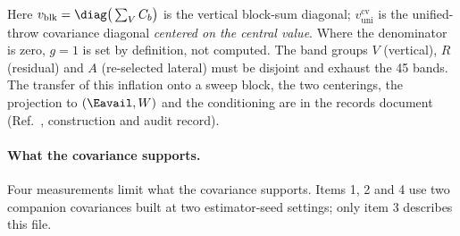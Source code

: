 Here $v_{\mathrm{blk}}=\diag\big(\sum_{V}C_{b}\big)$ is the vertical block-sum diagonal; $v^{\mathrm{cv}}_{\mathrm{uni}}$ is the unified-throw covariance diagonal \emph{centered on the central value}. Where the denominator is zero, $g=1$ is set by definition, not computed. The band groups $V$ (vertical), $R$ (residual) and $A$ (re-selected lateral) must be disjoint and exhaust the 45 bands. The transfer of this inflation onto a sweep block, the two centerings, the projection to $(\Eavail,W)$ and the conditioning are in the records document (Ref.~\cite{NoteRecords2026}, construction and audit record).

\paragraph{What the covariance supports.}

Four measurements limit what the covariance supports. Items 1, 2 and 4 use two companion covariances built at two estimator-seed settings; only item 3 describes this file.

